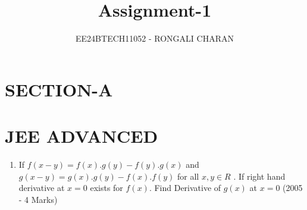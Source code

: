 \documentclass[journal,12pt,twocolumn]{IEEEtran}
\theoremstyle{remark}
\begin{document}

\vspace{3cm}

\title{\textbf{Assignment-1}}
\author{EE24BTECH11052 - RONGALI CHARAN}
\maketitle
\bigskip

\renewcommand{\thefigure}{\theenumi}
\renewcommand{\thetable}{\theenumi}
\onecolumn
\setlength{\columnsep}{2.5em}
\section*{SECTION-A}
\section*{JEE ADVANCED}
\begin{enumerate}
\subsection*{E - Subjective Problems}
    \item If $f(x-y)=f(x).g(y)-f(y).g(x)$ and $ g(x-y)=g(x).g(y)-f(x).f(y) $ for all $x,y \in R $ . If right hand derivative at $x=0$ exists for $f(x)$. Find Derivative of $g(x)$ at $x=0$
   \hfill(2005 - 4 Marks)
\end{enumerate}
\end{document}
